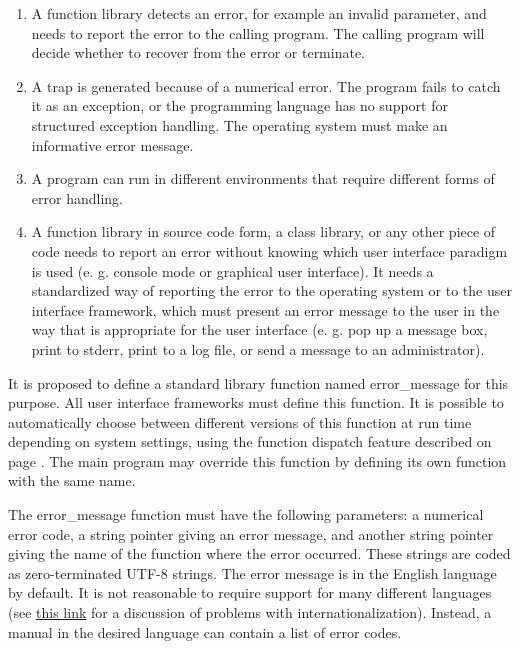 \documentclass[forwardcom.tex]{subfiles}
\begin{document}
\begin{enumerate}
\item A function library detects an error, for example an invalid parameter, and needs to report the error to the calling program. The calling program will decide whether to recover from the error or terminate. 

\item A trap is generated because of a numerical error. The program fails to catch it as an exception, or the programming language has no support for structured exception handling. The operating system must make an informative error message. 

\item A program can run in different environments that require different forms of error handling. 

\item A function library in source code form, a class library, or any other piece of code needs to report an error without knowing which user interface paradigm is used (e. g. console mode or graphical user interface). It needs a standardized way of reporting the error to the operating system or to the user interface framework, which must present an error 
message to the user in the way that is appropriate for the user interface (e. g. pop up a message box, print to stderr, print to a log file, or send a message to an administrator).
\end{enumerate}

\label{errorReportFunction}
It is proposed to define a standard library function named error\_message for this purpose. All user interface frameworks must define this function. It is possible to automatically choose between different versions of this function at run time depending on system settings, using the function dispatch feature described on page \pageref{libraryFunctionDispatchSystem}. The main program may override this function by defining its own function with the same name. 
\vspace{2mm}

The error\_message function must have the following parameters: a numerical error code, a string pointer giving an error message, and another string pointer giving the name of the function where the error occurred. These strings are coded as zero-terminated UTF-8 strings. 
The error message is in the English language by default. It is not reasonable to require support for many different languages (see 
\href{https://en.wikibooks.org/wiki/Usability_for_Nerds/Software/Internationalization}{this link} for a discussion of problems with internationalization). Instead, a manual in the desired language can contain a list of error codes. 
\vspace{2mm}
\end{document}
